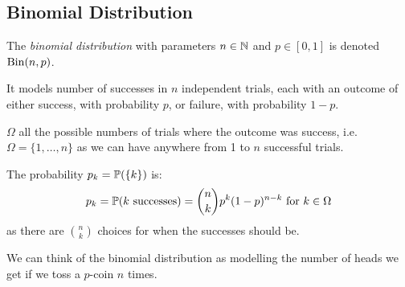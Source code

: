 \documentclass[../main.tex]{subfiles}
\begin{document}
\subsection{Binomial Distribution}
\label{binomialDist}
\begin{definition}
  The \textit{binomial distribution} with parameters $n \in \N$ and $p \in [0, 1]$ is denoted $\binomial(n, p)$.

  It models number of successes in $n$ independent trials, each with an outcome of either success, with probability $p$, or failure, with probability $1 - p$.

  $\Omega$ all the possible numbers of trials where the outcome was success, i.e. $\Omega = \{1, \ldots, n\}$ as we can have anywhere from 1 to $n$ successful trials.

  The probability $p_k = \P(\{k\})$ is:
  \[
    p_k = \P(\text{$k$ successes}) = \binom{n}{k}p^{k}(1 - p)^{n - k} \text{ for $k \in \Omega$}
  \]
  as there are $\binom{n}{k}$ choices for when the successes should be.
\end{definition}
\begin{remark}[Intuition]
  We can think of the binomial distribution as modelling the number of heads we get if we toss a $p$-coin $n$ times.
\end{remark}
\end{document}
